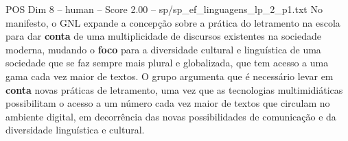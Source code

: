 \begin{textsample}{POS Dim 8 – human – Score 2.00 – sp/sp\_ef\_linguagens\_lp\_2\_p1.txt}  \label{ex:f8_pos_019}
No manifesto, o GNL expande a concepção sobre a prática do letramento na escola para dar \textbf{conta} de uma multiplicidade de discursos existentes na sociedade moderna, mudando o \textbf{foco} para a diversidade cultural e linguística de uma sociedade que se faz sempre mais plural e globalizada, que tem acesso a uma gama cada vez maior de textos.
O grupo argumenta que é necessário levar em \textbf{conta} novas práticas de letramento, uma vez que as tecnologias multimidiáticas possibilitam o acesso a um número cada vez maior de textos que circulam no ambiente digital, em decorrência das novas possibilidades de comunicação e da diversidade linguística e cultural.

\end{textsample}
